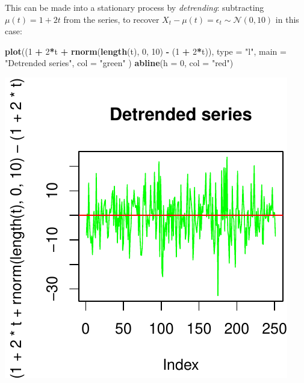 \documentclass[11pt,]{article}
\newenvironment{Shaded}{\begin{snugshade}}{\end{snugshade}}
\newcommand{\KeywordTok}[1]{\textcolor[rgb]{0.13,0.29,0.53}{\textbf{#1}}}
\newcommand{\DataTypeTok}[1]{\textcolor[rgb]{0.13,0.29,0.53}{#1}}
\newcommand{\DecValTok}[1]{\textcolor[rgb]{0.00,0.00,0.81}{#1}}
\newcommand{\StringTok}[1]{\textcolor[rgb]{0.31,0.60,0.02}{#1}}
\newcommand{\OperatorTok}[1]{\textcolor[rgb]{0.81,0.36,0.00}{\textbf{#1}}}
\newcommand{\NormalTok}[1]{#1}
\begin{document}
This can be made into a stationary process by \emph{detrending}:
subtracting \(\mu(t) = 1+2t\) from the series, to recover
\(X_t-\mu(t)=\epsilon_t\sim \mathcal{N}(0, 10)\) in this case:

\begin{Shaded}
\begin{Highlighting}[]
\KeywordTok{plot}\NormalTok{((}\DecValTok{1} \OperatorTok{+}\StringTok{ }\DecValTok{2}\OperatorTok{*}\NormalTok{t }\OperatorTok{+}\StringTok{ }\KeywordTok{rnorm}\NormalTok{(}\KeywordTok{length}\NormalTok{(t), }\DecValTok{0}\NormalTok{, }\DecValTok{10}\NormalTok{) }\OperatorTok{-}\StringTok{ }\NormalTok{(}\DecValTok{1} \OperatorTok{+}\StringTok{ }\DecValTok{2}\OperatorTok{*}\NormalTok{t)),}
     \DataTypeTok{type =} \StringTok{"l"}\NormalTok{,}
     \DataTypeTok{main =} \StringTok{"Detrended series"}\NormalTok{,}
     \DataTypeTok{col =} \StringTok{"green"}
\NormalTok{     )}
\KeywordTok{abline}\NormalTok{(}\DataTypeTok{h =} \DecValTok{0}\NormalTok{, }\DataTypeTok{col =} \StringTok{"red"}\NormalTok{)}
\end{Highlighting}
\end{Shaded}

\begin{center}\includegraphics{FMC_T4_PhD_Fin_Time_Series_files/figure-latex/detrend-1} \end{center}
\end{document}
